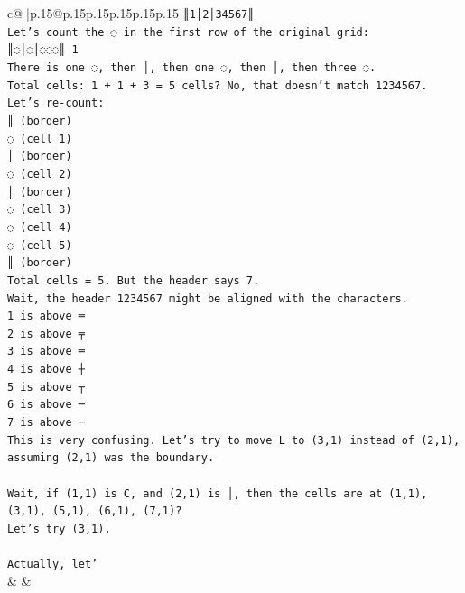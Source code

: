 \documentclass{article}
\begin{document}
{\begin{supertabular}{c@{$\;$}|p{.15\linewidth}@{}p{.15\linewidth}p{.15\linewidth}p{.15\linewidth}p{.15\linewidth}p{.15\linewidth}}
{{{\texttt{║1│2│34567║} \\
\texttt{Let's count the ◌ in the first row of the original grid:} \\
\texttt{║◌│◌│◌◌◌║ 1} \\
\texttt{There is one ◌, then │, then one ◌, then │, then three ◌.} \\
\texttt{Total cells: 1 + 1 + 3 = 5 cells? No, that doesn't match 1234567.} \\
\texttt{Let's re{-}count:} \\
\texttt{║ (border)} \\
\texttt{◌ (cell 1)} \\
\texttt{│ (border)} \\
\texttt{◌ (cell 2)} \\
\texttt{│ (border)} \\
\texttt{◌ (cell 3)} \\
\texttt{◌ (cell 4)} \\
\texttt{◌ (cell 5)} \\
\texttt{║ (border)} \\
\texttt{Total cells = 5. But the header says 7.} \\
\texttt{Wait, the header 1234567 might be aligned with the characters.} \\
\texttt{1 is above ═} \\
\texttt{2 is above ╤} \\
\texttt{3 is above ═} \\
\texttt{4 is above ┼} \\
\texttt{5 is above ┬} \\
\texttt{6 is above ─} \\
\texttt{7 is above ─} \\
\texttt{This is very confusing. Let's try to move L to (3,1) instead of (2,1), assuming (2,1) was the boundary.} \\
\\ 
\texttt{Wait, if (1,1) is C, and (2,1) is │, then the cells are at (1,1), (3,1), (5,1), (6,1), (7,1)?} \\
\texttt{Let's try (3,1).} \\
\\ 
\texttt{Actually, let'} \\
            }
        }
    }
    & & \\ \\


\end{supertabular}}
\end{document}

